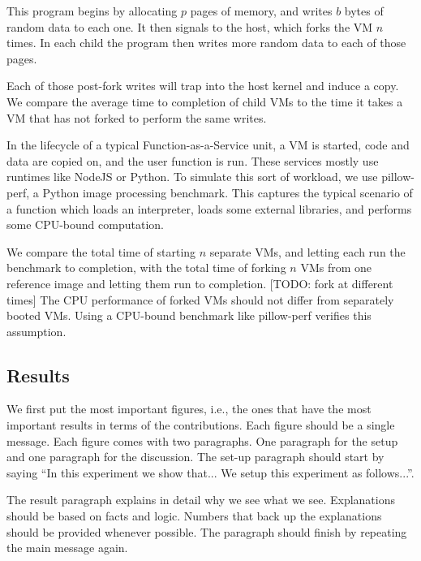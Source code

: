This program begins by allocating $p$ pages of memory, and writes $b$ bytes of random data to each one. It then signals to the host, which forks the VM $n$ times. In each child the program then writes more random data to each of those pages.

Each of those post-fork writes will trap into the host kernel and induce a copy. We compare the average time to completion of child VMs to the time it takes a VM that has not forked to perform the same writes.

 In the lifecycle of a typical Function-as-a-Service unit, a VM is started, code and data are copied on, and the user function is run. These services mostly use runtimes like NodeJS or Python. To simulate this sort of workload, we use pillow-perf, a Python image processing benchmark. This captures the typical scenario of a function which loads an interpreter, loads some external libraries, and performs some CPU-bound computation.

We compare the total time of starting $n$ separate VMs, and letting each run the benchmark to completion, with the total time of forking $n$ VMs from one reference image and letting them run to completion. [TODO: fork at different times] The CPU performance of forked VMs should not differ from separately booted VMs. Using a CPU-bound benchmark like pillow-perf verifies this assumption.

\subsection{Results}

We first put the most important figures, i.e., the
ones that have the most important results in terms
of the contributions. Each figure should be a
single message. Each figure comes with two
paragraphs. One paragraph for the setup and one
paragraph for the discussion. The set-up paragraph
should start by saying ``In this experiment we
show that... We setup this experiment as follows...''.

The result paragraph explains in detail why we see
what we see. Explanations should be based on facts
and logic. Numbers that back up the explanations
should be provided whenever possible. The
paragraph should finish by repeating the main
message again.
